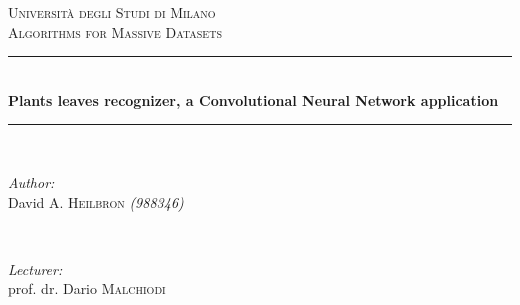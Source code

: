 \documentclass[11pt]{article}
\begin{document}
\begin{titlepage}

\newcommand{\HRule}{\rule{\linewidth}{0.5mm}} %

\center %
 

\textsc{\LARGE Università degli Studi di Milano}\\[5.5cm] %
\textsc{\Large Algorithms for Massive Datasets}\\[0.5cm] %


\HRule \\[0.4cm]
{ \huge \bfseries Plants leaves recognizer, a Convolutional Neural Network application}\\[0.4cm] %
\HRule \\[1.5cm]
 

\begin{minipage}{0.4\textwidth}
\begin{flushleft} \large
\emph{Author:}\\
David A. \textsc{Heilbron} \textit{(988346)} \\
\end{flushleft}
\end{minipage}
~
\begin{minipage}{0.4\textwidth}
\begin{flushright} \large
\emph{Lecturer:} \\
prof. dr. Dario \textsc{Malchiodi} \\
\end{flushright}
\end{minipage}\\[2cm]


\end{titlepage}
\end{document}

